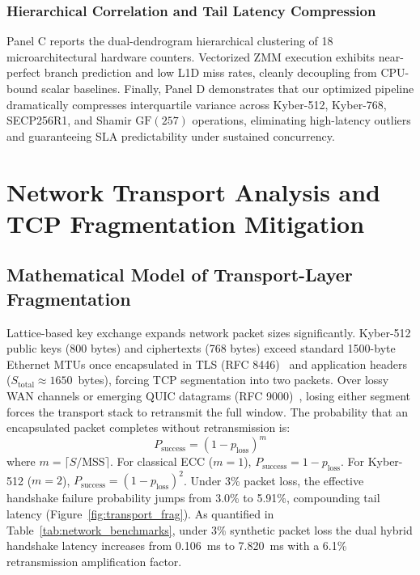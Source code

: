 \documentclass[pdflatex,sn-mathphys,Numbered]{sn-jnl}%
\theoremstyle{thmstyleone}%
\theoremstyle{thmstyletwo}%
\theoremstyle{thmstylethree}%
\begin{document}
\subsubsection{\textbf{Hierarchical Correlation and Tail Latency Compression}}
Panel C reports the dual-dendrogram hierarchical clustering of 18 microarchitectural hardware counters. Vectorized ZMM execution exhibits near-perfect branch prediction and low L1D miss rates, cleanly decoupling from CPU-bound scalar baselines. Finally, Panel D demonstrates that our optimized pipeline dramatically compresses interquartile variance across Kyber-512, Kyber-768, SECP256R1, and Shamir $\text{GF}(257)$ operations, eliminating high-latency outliers and guaranteeing SLA predictability under sustained concurrency.

\section{Network Transport Analysis and TCP Fragmentation Mitigation}\label{sec:transport}

\subsection{\textbf{Mathematical Model of Transport-Layer Fragmentation}}
Lattice-based key exchange expands network packet sizes significantly. Kyber-512 public keys (800 bytes) and ciphertexts (768 bytes) exceed standard 1500-byte Ethernet MTUs once encapsulated in TLS (RFC 8446)~\cite{rescorla2018tls} and application headers ($S_{\text{total}} \approx 1650$~bytes), forcing TCP segmentation into two packets. Over lossy WAN channels or emerging QUIC datagrams (RFC 9000)~\cite{iyengar2021quic}, losing either segment forces the transport stack to retransmit the full window. The probability that an encapsulated packet completes without retransmission is:
\begin{equation}
P_{\text{success}} = (1 - p_{\text{loss}})^m
\end{equation}
where $m = \lceil S / \text{MSS} \rceil$. For classical ECC ($m=1$), $P_{\text{success}} = 1 - p_{\text{loss}}$. For Kyber-512 ($m=2$), $P_{\text{success}} = (1 - p_{\text{loss}})^2$. Under 3\% packet loss, the effective handshake failure probability jumps from 3.0\% to 5.91\%, compounding tail latency (Figure~\ref{fig:transport_frag}). As quantified in Table~\ref{tab:network_benchmarks}, under 3\% synthetic packet loss the dual hybrid handshake latency increases from 0.106~ms to 7.820~ms with a 6.1\% retransmission amplification factor.
\end{document}
